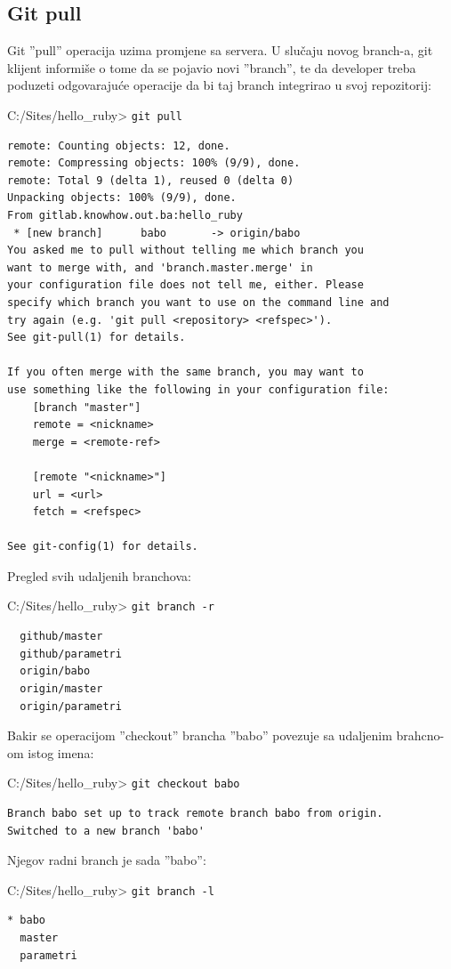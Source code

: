\documentclass[times, utf8, seminar]{fit}
\begin{document}
\subsection{Git pull}

Git ''pull'' operacija uzima promjene sa servera. U slučaju novog branch-a, git klijent informiše o tome da se pojavio novi ''branch'', te da developer treba poduzeti odgovarajuće operacije da bi taj branch integrirao u svoj repozitorij:

C:/Sites/hello\_ruby> \texttt{git pull}
\begin{lstlisting}
remote: Counting objects: 12, done.
remote: Compressing objects: 100% (9/9), done.
remote: Total 9 (delta 1), reused 0 (delta 0)
Unpacking objects: 100% (9/9), done.
From gitlab.knowhow.out.ba:hello_ruby
 * [new branch]      babo       -> origin/babo
You asked me to pull without telling me which branch you
want to merge with, and 'branch.master.merge' in
your configuration file does not tell me, either. Please
specify which branch you want to use on the command line and
try again (e.g. 'git pull <repository> <refspec>').
See git-pull(1) for details.

If you often merge with the same branch, you may want to
use something like the following in your configuration file:
    [branch "master"]
    remote = <nickname>
    merge = <remote-ref>

    [remote "<nickname>"]
    url = <url>
    fetch = <refspec>

See git-config(1) for details.
\end{lstlisting}

Pregled svih udaljenih branchova:

C:/Sites/hello\_ruby> \texttt{git branch -r}
\begin{lstlisting}
  github/master
  github/parametri
  origin/babo
  origin/master
  origin/parametri
\end{lstlisting}

Bakir se operacijom ''checkout'' brancha ''babo'' povezuje sa udaljenim brahcno-om istog imena:

C:/Sites/hello\_ruby> \texttt{git checkout babo}
\begin{lstlisting}
Branch babo set up to track remote branch babo from origin.
Switched to a new branch 'babo'
\end{lstlisting}

Njegov radni branch je sada ''babo'':

C:/Sites/hello\_ruby> \texttt{git branch -l}
\begin{lstlisting}
* babo
  master
  parametri
\end{lstlisting}
\end{document}
